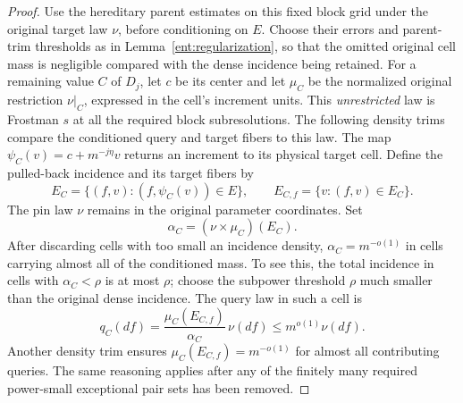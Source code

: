 \begin{proof}
Use the hereditary parent estimates on this fixed block grid under
the original target law $\nu$, before conditioning on $E$. Choose
their errors and parent-trim thresholds as in
Lemma~\ref{ent:regularization}, so that the omitted original cell
mass is negligible compared with the dense incidence being retained.
For a remaining value $C$ of $D_j$, let $c$ be its center and let
$\mu_C$ be the normalized original restriction $\nu|_C$, expressed
in the cell's increment units. This \emph{unrestricted} law is
Frostman $s$ at all the required block subresolutions. The following
density trims compare the conditioned query and target fibers to
this law. The map
$\psi_C(v)=c+m^{-j\eta}v$ returns an increment to its physical
target cell. Define the pulled-back incidence and its target fibers by
\[
 E_C=\{(f,v):(f,\psi_C(v))\in E\},\qquad
 E_{C,f}=\{v:(f,v)\in E_C\}.
\]
The pin law $\nu$ remains in the original parameter coordinates.
Set
\[
 \alpha_C=(\nu\times\mu_C)(E_C).
\]
After discarding cells with too small an incidence density,
$\alpha_C=m^{-o(1)}$ in cells carrying almost all of the
conditioned mass. To see this, the total incidence in cells with
$\alpha_C<\rho$ is at most $\rho$; choose the subpower threshold
$\rho$ much smaller than the original dense incidence. The query
law in such a cell is
\begin{equation}
 q_C(df)=\frac{\mu_C(E_{C,f})}{\alpha_C}\,\nu(df)
 \le m^{o(1)}\nu(df).
 \label{proj:query-domination}
\end{equation}
Another density trim ensures $\mu_C(E_{C,f})=m^{-o(1)}$ for almost
all contributing queries. The same reasoning applies after any
of the finitely many required power-small exceptional pair sets
has been removed.


\end{proof}
